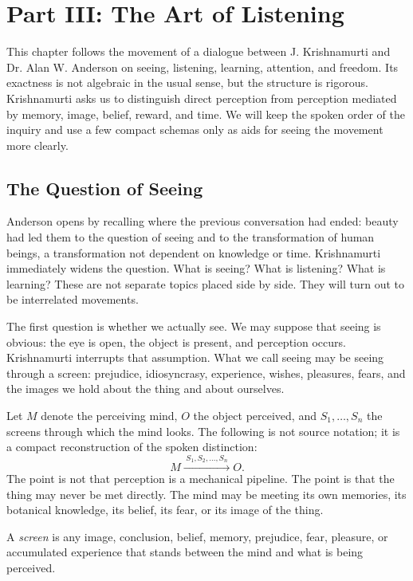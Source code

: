 \chapter{Part III: The Art of Listening}

This chapter follows the movement of a dialogue between J. Krishnamurti and Dr. Alan W. Anderson on seeing, listening, learning, attention, and freedom. Its exactness is not algebraic in the usual sense, but the structure is rigorous. Krishnamurti asks us to distinguish direct perception from perception mediated by memory, image, belief, reward, and time. We will keep the spoken order of the inquiry and use a few compact schemas only as aids for seeing the movement more clearly.

\section{The Question of Seeing}

Anderson opens by recalling where the previous conversation had ended: beauty had led them to the question of seeing and to the transformation of human beings, a transformation not dependent on knowledge or time. Krishnamurti immediately widens the question. What is seeing? What is listening? What is learning? These are not separate topics placed side by side. They will turn out to be interrelated movements.

The first question is whether we actually see. We may suppose that seeing is obvious: the eye is open, the object is present, and perception occurs. Krishnamurti interrupts that assumption. What we call seeing may be seeing through a screen: prejudice, idiosyncrasy, experience, wishes, pleasures, fears, and the images we hold about the thing and about ourselves.

Let \(M\) denote the perceiving mind, \(O\) the object perceived, and \(S_1,\ldots,S_n\) the screens through which the mind looks. The following is not source notation; it is a compact reconstruction of the spoken distinction:
\begin{equation}
M \xrightarrow{\;S_1,S_2,\ldots,S_n\;} O .
\end{equation}
The point is not that perception is a mechanical pipeline. The point is that the thing may never be met directly. The mind may be meeting its own memories, its botanical knowledge, its belief, its fear, or its image of the thing.

\begin{definition}
A \emph{screen} is any image, conclusion, belief, memory, prejudice, fear, pleasure, or accumulated experience that stands between the mind and what is being perceived.
\end{definition}

